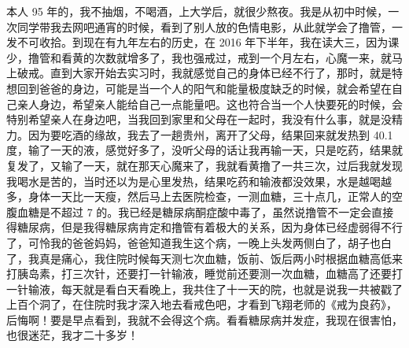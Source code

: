 \begin{case}
    本人 95 年的，我不抽烟，不喝酒，上大学后，就很少熬夜。我是从初中时候，一次同学带我去网吧通宵的时候，看到了别人放的色情电影，从此就学会了撸管，一发不可收拾。到现在有九年左右的历史，在 2016 年下半年，我在读大三，因为课少，撸管和看黄的次数就增多了，我也强戒过，戒到一个月左右，心魔一来，就马上破戒。直到大家开始去实习时，我就感觉自己的身体已经不行了，那时，就是特想回到爸爸的身边，可能是当一个人的阳气和能量极度缺乏的时候，就会希望在自己亲人身边，希望亲人能给自己一点能量吧。这也符合当一个人快要死的时候，会特别希望亲人在身边吧，当我回到家里和父母在一起时，我没有什么事，就是没精力。因为要吃酒的缘故，我去了一趟贵州，离开了父母，结果回来就发热到 40.1 度，输了一天的液，感觉好多了，没听父母的话让我再输一天，只是吃药，结果就复发了，又输了一天，就在那天心魔来了，我就看黄撸了一共三次，过后我就发现我喝水是苦的，当时还以为是心里发热，结果吃药和输液都没效果，水是越喝越多，身体一天比一天瘦，然后马上去医院检查，一测血糖，三十点几，正常人的空腹血糖是不超过 7 的。我已经是糖尿病酮症酸中毒了，虽然说撸管不一定会直接得糖尿病，但是我得糖尿病肯定和撸管有着极大的关系，因为身体已经虚弱得不行了，可怜我的爸爸妈妈，爸爸知道我生这个病，一晚上头发两侧白了，胡子也白了，我真是痛心，我住院时候每天测七次血糖，饭前、饭后两小时根据血糖高低来打胰岛素，打三次针，还要打一针输液，睡觉前还要测一次血糖，血糖高了还要打一针输液，每天就是看白天看晚上，我共住了十一天的院，也就是说我一共被戳了上百个洞了，在住院时我才深入地去看戒色吧，才看到飞翔老师的《戒为良药》，后悔啊！要是早点看到，我就不会得这个病。看看糖尿病并发症，我现在很害怕，也很迷茫，我才二十多岁！

\end{case}

